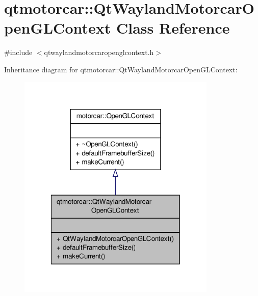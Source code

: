 \hypertarget{classqtmotorcar_1_1QtWaylandMotorcarOpenGLContext}{\section{qtmotorcar\-:\-:Qt\-Wayland\-Motorcar\-Open\-G\-L\-Context Class Reference}
\label{classqtmotorcar_1_1QtWaylandMotorcarOpenGLContext}
}


{\ttfamily \#include $<$qtwaylandmotorcaropenglcontext.\-h$>$}



Inheritance diagram for qtmotorcar\-:\-:Qt\-Wayland\-Motorcar\-Open\-G\-L\-Context\-:
\nopagebreak
\begin{figure}[H]
\begin{center}
\leavevmode
\includegraphics[width=268pt]{classqtmotorcar_1_1QtWaylandMotorcarOpenGLContext__inherit__graph}
\end{center}
\end{figure}


